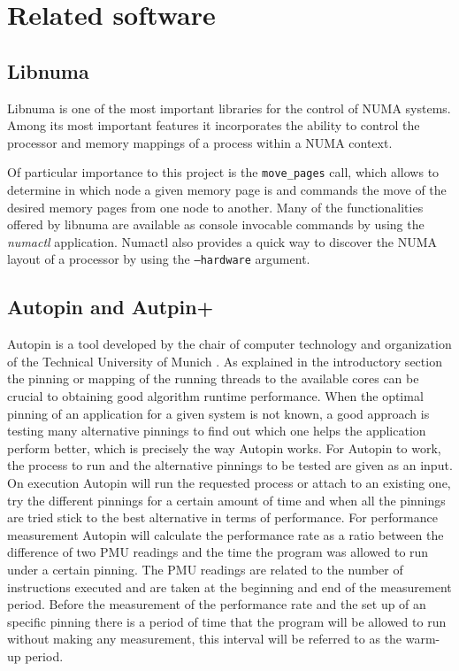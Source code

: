 \section{Related software}\label{section:relatedsw}

\subsection{Libnuma}\label{subsection:libnuma}

Libnuma \cite{libnuma} is one of the most important libraries for the control of NUMA systems. Among its most important features it incorporates the ability to control the processor and memory mappings of a process within a NUMA context.

Of particular importance to this project is the \texttt{move\_pages} call, which allows to determine in which node a given memory page is and commands the move of the desired memory pages from one node to another. Many of the functionalities offered by libnuma are available as console invocable commands by using the \textit{numactl} application. Numactl also provides a quick way to discover the NUMA layout of a processor by using the \texttt{--hardware} argument.

\subsection{Autopin and Autpin+}\label{subsection:autopin2}
Autopin is a tool developed by the chair of computer technology and organization of the Technical University of Munich \cite{autopin}. As explained in the introductory section the pinning or mapping of the running threads to the available cores can be crucial to obtaining good algorithm runtime performance. When the optimal pinning of an application for a given system is not known, a good approach is testing many alternative pinnings to find out which one helps the application perform better, which is precisely the way Autopin works.
For Autopin to work, the process to run and the alternative pinnings to be tested are given as an input. On execution Autopin will run the requested process or attach to an existing one, try the different pinnings for a certain amount of time and when all the pinnings are tried stick to the best alternative in terms of performance. For performance measurement Autopin will calculate the performance rate as a ratio between the difference of two PMU readings and the time the program was allowed to run under a certain pinning. The PMU readings are related to the number of instructions executed and are taken at the beginning and end of the measurement period. Before the measurement of the performance rate and the set up of an specific pinning there is a period of time that the program will be allowed to run without making any measurement, this interval will be referred to as the warm-up period.

